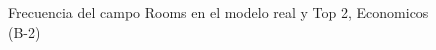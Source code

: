 \begin{figure}[H]
    \centering
    
    \caption{Frecuencia del campo Rooms en el modelo real y Top 2, Economicos (B-2)}
    \label{frecuency-Rooms-top2}
\end{figure}